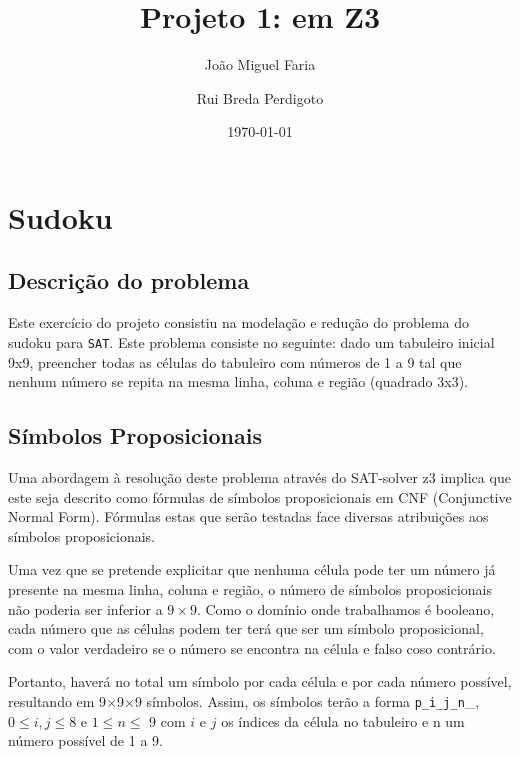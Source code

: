 \documentclass[a4paper,12pt]{article}
\title{Projeto 1: \sat em {Z3}}
\author{João Miguel Faria \and Rui Breda Perdigoto}
\date{\today}
\newcommand{\sat}{\texttt{SAT}\xspace}
\begin{document}
\maketitle

\section{Sudoku}

\subsection{Descrição do problema}
Este exercício do projeto consistiu na modelação e redução do problema do
sudoku para \sat. Este problema consiste no seguinte: dado um tabuleiro inicial
9x9, preencher todas as células do tabuleiro com números de 1 a 9 tal que
nenhum número se repita na mesma linha, coluna e região (quadrado 3x3).

\subsection{Símbolos Proposicionais}
Uma abordagem à resolução deste problema através do SAT-solver z3 implica que
este seja descrito como fórmulas de símbolos proposicionais em CNF (Conjunctive
Normal Form). Fórmulas estas que serão testadas face diversas atribuições aos
símbolos proposicionais.

Uma vez que se pretende explicitar que nenhuma célula pode ter um número já
presente na mesma linha, coluna e região, o número de símbolos proposicionais
não poderia ser inferior a $9\times9$. Como o domínio onde trabalhamos é
booleano, cada número que as células podem ter terá que ser um símbolo
proposicional, com o valor verdadeiro se o número se encontra na célula e falso
coso contrário.
 
Portanto, haverá no total um símbolo por cada célula e por cada número
possível, resultando em 9$\times$9$\times$9 símbolos. Assim, os símbolos terão
a forma \texttt{p\_i\_j\_n}\_, $0\leq i, j \leq 8$
e $1 \leq n \leq$ 9 com $i$ e $j$ os índices da célula no tabuleiro e n um
número possível de 1 a 9.
\end{document}
